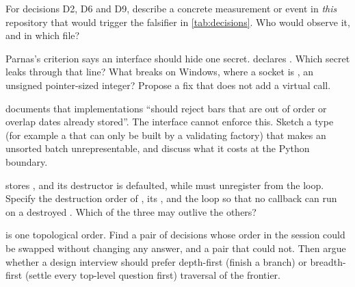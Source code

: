 \begin{exercises}
 For decisions D2, D6 and D9, describe a concrete measurement or event in \emph{this} repository that
would trigger the falsifier in \cref{tab:decisions}. Who would observe it, and in which file?

 Parnas's criterion says an interface should hide one secret.  declares
. Which secret leaks through that line? What breaks on Windows, where a socket is
, an unsigned pointer-sized integer? Propose a fix that does not add a virtual call.

  documents that implementations ``should reject bars that are out of
order or overlap dates already stored''. The interface cannot enforce this. Sketch a type (for example a
 that can only be built by a validating factory) that makes an unsorted batch unrepresentable, and
discuss what it costs at the Python boundary.

  stores , and its destructor is defaulted, while
 must unregister from the loop. Specify the destruction order of , its , and the
loop so that no callback can run on a destroyed . Which of the three may outlive the others?

  is one topological order. Find a pair of decisions whose order in the session
could be swapped without changing any answer, and a pair that could not. Then argue whether a design interview
should prefer depth-first (finish a branch) or breadth-first (settle every top-level question first) traversal of the frontier.
\end{exercises}

